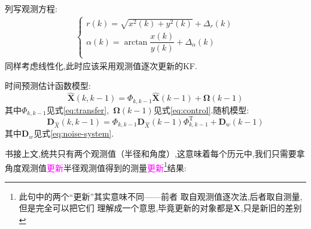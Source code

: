 \documentclass[cn,10pt,citestyle=gb7714-2015,bibstyle=gb7714-2015]{elegantbook}
\newcommand{\mT}{\mathrm{T}}
\begin{document}
\begin{solution}
        列写观测方程:
        \begin{equation}
            \begin{aligned}
                \left\{ \begin{array}{l}
                    r\left( k \right) =\sqrt{x^2\left( k \right) +y^2\left( k \right)}+\Delta _r\left( k \right)\\
                    \alpha \left( k \right) =\arctan \dfrac{x\left( k \right)}{y\left( k \right)}+\Delta _{\alpha}\left( k \right)\\
                \end{array} \right. 
            \end{aligned}
            \end{equation}
        同样考虑线性化,此时应该采用观测值逐次更新的KF.

        时间预测估计函数模型:
    \begin{equation}
        \hat{\bm{X}}(k,k-1)=\bm{\varPhi}_{k,k-1}\hat{\bm{X}}(k-1)+\bm{\Omega}(k-1)
    \end{equation}
    其中$\bm{\varPhi}_{k,k-1}$见式\eqref{eq:transfer},\ $\bm{\Omega}(k-1)$见式\eqref{eq:control}.随机模型:
    \begin{equation}
        \bm{D}_{\hat{X}}(k,k-1)=\bm{\varPhi}_{k,k-1}\bm{D}_{\hat{X}}(k-1)\bm{\varPhi}_{k,k-1}^\mT+\bm{D}_w(k-1)
    \end{equation}
    其中$\bm{D}_w$见式\eqref{eq:noise-system}.

    书接上文,统共只有两个观测值（半径和角度）,这意味着每个历元中,我们只需要拿
    角度观测值\textcolor{magenta}{更新}半径观测值得到的测量\textcolor{magenta}{更新}\footnote{此句中的两个“更新”其实意味不同——前者
    取自观测值逐次法,后者取自测量,但是完全可以把它们
    理解成一个意思,毕竟更新的对象都是$\bm{X}$,只是新旧的差别}结果:


\end{solution}
\end{document}

